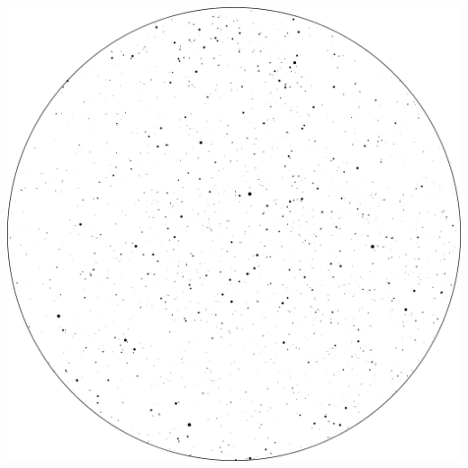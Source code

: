 \documentclass{SAS-class-skygen}
\begin{document}
	\vspace{0.5cm}
    \begin{center}
    \includegraphics[width=\textwidth]{./pics/sky_chart11.png}
    \end{center}
    
    
\end{document}

